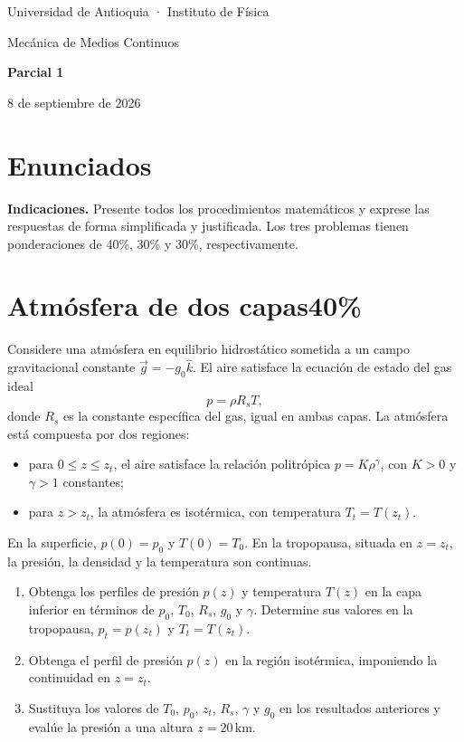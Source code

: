 \documentclass[11pt,a4paper]{article}
\begin{document}
\begin{center}
    {\small Universidad de Antioquia · Instituto de Física\par}
    \vspace{4pt}
    {\large Mecánica de Medios Continuos\par}
    \vspace{6pt}
    {\LARGE\bfseries Parcial 1\par}
    \vspace{4pt}
    {8 de septiembre de 2026\par}
\end{center}

\section*{Enunciados}

\textbf{Indicaciones.} Presente todos los procedimientos matemáticos y exprese
las respuestas de forma simplificada y justificada. Los tres problemas tienen
ponderaciones de 40\%, 30\% y 30\%, respectivamente.

\section{Atmósfera de dos capas\hfill 40\%}

Considere una atmósfera en equilibrio hidrostático sometida a un campo gravitacional constante $\vec{g} = -g_0 \hat{k}$. El aire satisface la ecuación de estado del gas ideal
\[
p = \rho R_s T,
\]
donde $R_s$ es la constante específica del gas, igual en ambas capas. La atmósfera está compuesta por dos regiones:
\begin{itemize}
    \item para $0 \le z \le z_t$, el aire satisface la relación politrópica $p = K\rho^\gamma$, con $K > 0$ y $\gamma > 1$ constantes;
    \item para $z > z_t$, la atmósfera es isotérmica, con temperatura $T_t = T(z_t)$.
\end{itemize}
En la superficie, $p(0) = p_0$ y $T(0) = T_0$. En la tropopausa, situada en $z = z_t$, la presión, la densidad y la temperatura son continuas.
\begin{enumerate}[label=\alph*), leftmargin=*]
    \item Obtenga los perfiles de presión $p(z)$ y temperatura $T(z)$ en la capa inferior en términos de $p_0$, $T_0$, $R_s$, $g_0$ y $\gamma$. Determine sus valores en la tropopausa, $p_t = p(z_t)$ y $T_t = T(z_t)$.
    \item Obtenga el perfil de presión $p(z)$ en la región isotérmica, imponiendo la continuidad en $z = z_t$.
    \item Sustituya los valores de $T_0$, $p_0$, $z_t$, $R_s$, $\gamma$ y $g_0$ en los resultados anteriores y evalúe la presión a una altura $z = 20\,\mathrm{km}$.
\end{enumerate}
\end{document}
